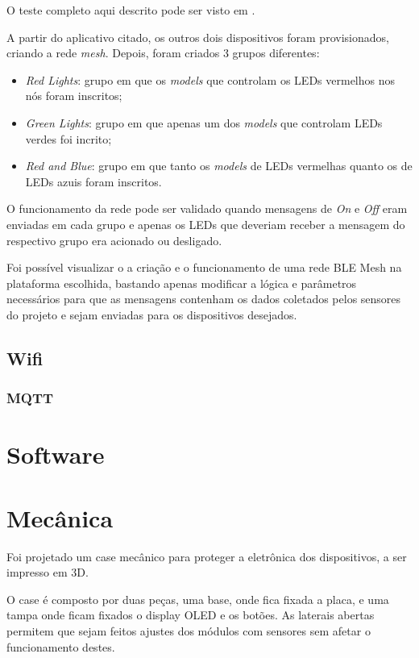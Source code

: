 \documentclass[../monografia.tex]{subfiles}
\begin{document}
O teste completo aqui descrito pode ser visto em \cite{teste-ble-mesh}.

A partir do aplicativo citado, os outros dois dispositivos foram provisionados, criando a rede \textit{mesh}. Depois, foram criados 3 grupos diferentes:

\begin{itemize}
	\item \textit{Red Lights}: grupo em que os \textit{models} que controlam os LEDs vermelhos nos nós foram inscritos;
	\item \textit{Green Lights}: grupo em que apenas um dos \textit{models} que controlam LEDs verdes foi incrito;
	\item \textit{Red and Blue}: grupo em que tanto os \textit{models} de LEDs vermelhas quanto os de LEDs azuis foram inscritos.
\end{itemize}

O funcionamento da rede pode ser validado quando mensagens de \textit{On} e \textit{Off} eram enviadas em cada grupo e apenas os LEDs que deveriam receber a mensagem do respectivo grupo era acionado ou desligado.

Foi possível visualizar o a criação e o funcionamento de uma rede BLE Mesh na plataforma escolhida, bastando apenas modificar a lógica e parâmetros necessários para que as mensagens contenham os dados coletados pelos sensores do projeto e sejam enviadas para os dispositivos desejados.

\subsection{Wifi}
\subsubsection{MQTT}
\section{Software}
\section{Mecânica}

Foi projetado um case mecânico para proteger a eletrônica dos dispositivos, a ser impresso em 3D. 

O case é composto por duas peças, uma base, onde fica fixada a placa, e uma tampa onde ficam fixados o display OLED e os botões. As laterais abertas permitem que sejam feitos ajustes dos módulos com sensores sem afetar o funcionamento destes. 
\end{document}
